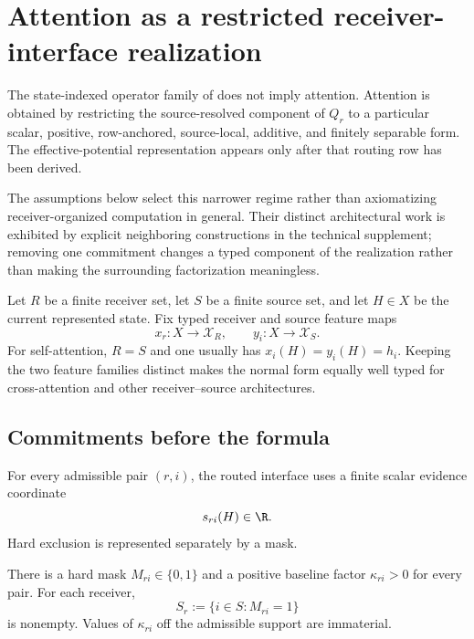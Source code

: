 \section{Attention as a restricted receiver-interface realization}\label{sec:attention}

The state-indexed operator family of  does not imply attention. Attention is obtained by restricting the source-resolved component of $Q_r$ to a particular scalar, positive, row-anchored, source-local, additive, and finitely separable form. The effective-potential representation appears only after that routing row has been derived.

The assumptions below select this narrower regime rather than axiomatizing receiver-organized computation in general. Their distinct architectural work is exhibited by explicit neighboring constructions in the technical supplement; removing one commitment changes a typed component of the realization rather than making the surrounding factorization meaningless.

Let $R$ be a finite receiver set, let $S$ be a finite source set, and let $H\in X$ be the current represented state. Fix typed receiver and source feature maps
\[
x_r:X\to\mathcal X_R,
\qquad
y_i:X\to\mathcal X_S.
\]
For self-attention, $R=S$ and one usually has $x_i(H)=y_i(H)=h_i$. Keeping the two feature families distinct makes the normal form equally well typed for cross-attention and other receiver--source architectures.

\subsection{Commitments before the formula}

\begin{assumption}\label{ass:pairwise-scalar}
For every admissible pair $(r,i)$, the routed interface uses a finite scalar evidence coordinate
\[
s_{ri}(H)\in\R.
\]
Hard exclusion is represented separately by a mask.
\end{assumption}

\begin{assumption}\label{ass:positive-baseline}
There is a hard mask $M_{ri}\in\{0,1\}$ and a positive baseline factor $\kappa_{ri}>0$ for every pair. For each receiver,
\[
S_r:=\{i\in S:M_{ri}=1\}
\]
is nonempty. Values of $\kappa_{ri}$ off the admissible support are immaterial.
\end{assumption}

